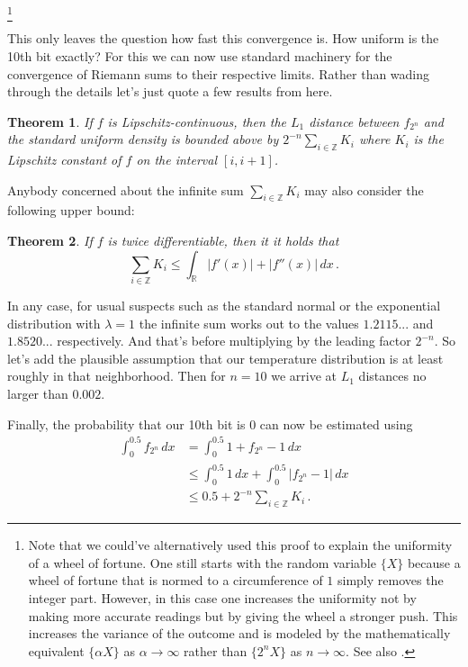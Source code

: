 \documentclass{article}
\theoremstyle{theorem}
\newtheorem{theorem}{Theorem}
\theoremstyle{definition}
\begin{document}
\let\thefootnote\relax\footnote{Note that we could've alternatively used this proof to explain the uniformity of a wheel of fortune. One still starts with the random variable $\{X\}$ because a wheel of fortune that is normed to a circumference of $1$ simply removes the integer part. However, in this case one increases the uniformity not by making more accurate readings but by giving the wheel a stronger push. This increases the variance of the outcome and is modeled by the mathematically equivalent $\{\alpha X\}$ as $\alpha\to\infty$ rather than $\{2^n X\}$ as $n\to\infty$. See also \cite{Zaman}.}
\addtocounter{footnote}{-1}\let\thefootnote\svthefootnote
This only leaves the question how fast this convergence is. How uniform is the 10th bit exactly? For this we can now use standard machinery for the convergence of Riemann sums to their respective limits. Rather than wading through the details let's just quote a few results from \cite{Me} here.

\begin{theorem}
If $f$ is Lipschitz-continuous, then the $L_1$ distance between $f_{2^n}$ and the standard uniform density is bounded above by $2^{-n}\sum_{i\in\mathbb{Z}}K_i$ where $K_i$ is the Lipschitz constant of $f$ on the interval $[i,i+1]$.
\end{theorem}

Anybody concerned about the infinite sum $\sum_{i\in\mathbb{Z}}K_i$ may also consider the following upper bound:

\begin{theorem}
If $f$ is twice differentiable, then it it holds that
\[
\sum_{i\in\mathbb{Z}}K_i \leq \int_\mathbb{R} |f'(x)|+|f''(x)|\,dx\,.
\]
\end{theorem}

In any case, for usual suspects such as the standard normal or the exponential distribution with $\lambda=1$ the infinite sum works out to the values $1.2115...$ and $1.8520...$ respectively. And that's before multiplying by the leading factor $2^{-n}$. So let's add the plausible assumption that our temperature distribution is at least roughly in that neighborhood. Then for $n=10$ we arrive at $L_1$ distances no larger than $0.002$.

Finally, the probability that our 10th bit is $0$ can now be estimated using
\[
\begin{split}
\int_0^{0.5} f_{2^n}\,dx
& = \int_0^{0.5} 1 + f_{2^n} - 1\,dx\\
& \leq \int_0^{0.5}1\,dx + \int_0^{0.5} |f_{2^n}-1|\,dx\\
& \leq 0.5+2^{-n}\sum_{i\in\mathbb{Z}}K_i\,.
\end{split}
\]
\end{document}

